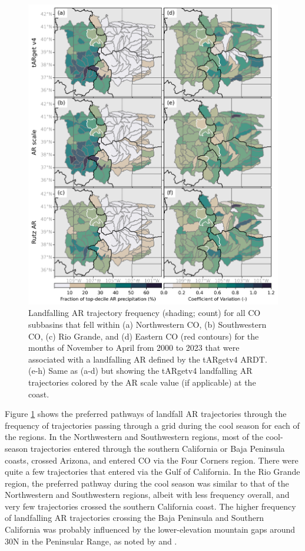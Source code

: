 \documentclass[draft]{agujournal2019}
\begin{document}
\begin{figure}
\noindent\includegraphics[width=\textwidth, height=\textheight, keepaspectratio]{fig3.png}
\caption{Landfalling AR trajectory frequency (shading; count) for all CO subbasins that fell within (a) Northwestern CO, (b) Southwestern CO, (c) Rio Grande, and (d) Eastern CO (red contours) for the months of November to April from 2000 to 2023 that were associated with a landfalling AR defined by the tARgetv4 ARDT. (e-h) Same as (a-d) but showing the tARgetv4 landfalling AR trajectories colored by the AR scale value (if applicable) at the coast.}
\label{fig:heatmap-spaghetti_NDJFMA}
\end{figure}

Figure \ref{fig:heatmap-spaghetti_NDJFMA} shows the preferred pathways of landfall AR trajectories through the frequency of trajectories passing through a grid during the cool season for each of the regions. In the Northwestern and Southwestern regions, most of the cool-season trajectories entered through the southern California or Baja Peninsula coasts, crossed Arizona, and entered CO via the Four Corners region. There were quite a few trajectories that entered via the Gulf of California. In the Rio Grande region, the preferred pathway during the cool season was similar to that of the Northwestern and Southwestern regions, albeit with less frequency overall, and very few trajectories crossed the southern California coast. The higher frequency of landfalling AR trajectories crossing the Baja Peninsula and Southern California was probably influenced by the lower-elevation mountain gaps around 30\textdegree N in the Peninsular Range, as noted by  and . 
\end{document}

